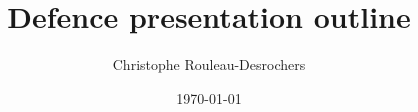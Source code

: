 \documentclass{article}\usepackage[]{graphicx}\usepackage[]{xcolor}
\begin{document}
\title{Defence presentation outline}
\author{Christophe Rouleau-Desrochers}
\date{\today}
\maketitle

\end{document}
